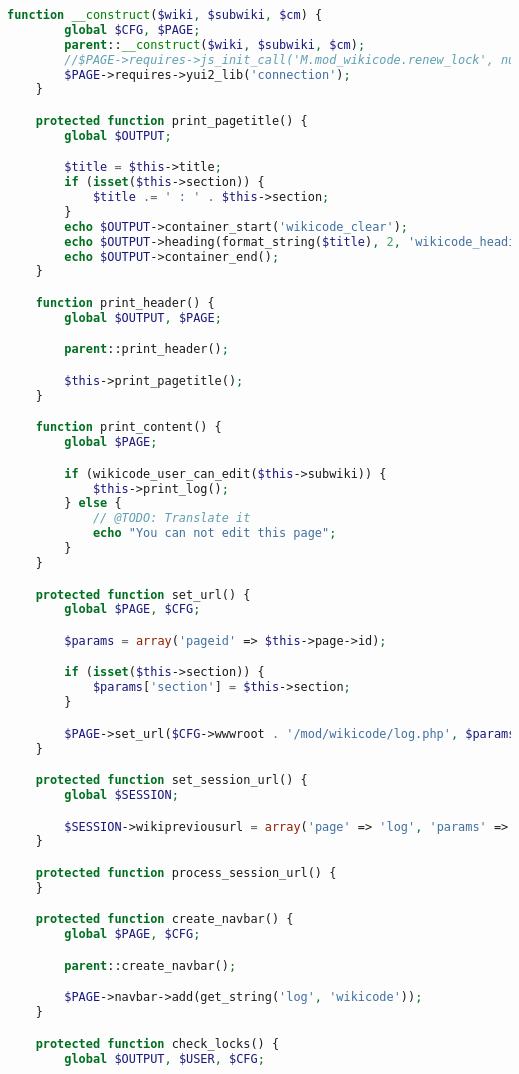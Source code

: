 \begin{lstlisting}[language=PHP]
    function __construct($wiki, $subwiki, $cm) {
        global $CFG, $PAGE;
        parent::__construct($wiki, $subwiki, $cm);
        //$PAGE->requires->js_init_call('M.mod_wikicode.renew_lock', null, true);
        $PAGE->requires->yui2_lib('connection');
    }

    protected function print_pagetitle() {
        global $OUTPUT;

        $title = $this->title;
        if (isset($this->section)) {
            $title .= ' : ' . $this->section;
        }
        echo $OUTPUT->container_start('wikicode_clear');
        echo $OUTPUT->heading(format_string($title), 2, 'wikicode_headingtitle');
        echo $OUTPUT->container_end();
    }

    function print_header() {
        global $OUTPUT, $PAGE;

        parent::print_header();

        $this->print_pagetitle();
    }

    function print_content() {
        global $PAGE;

        if (wikicode_user_can_edit($this->subwiki)) {
            $this->print_log();
        } else {
            // @TODO: Translate it
            echo "You can not edit this page";
        }
    }

    protected function set_url() {
        global $PAGE, $CFG;

        $params = array('pageid' => $this->page->id);

        if (isset($this->section)) {
            $params['section'] = $this->section;
        }

        $PAGE->set_url($CFG->wwwroot . '/mod/wikicode/log.php', $params);
    }

    protected function set_session_url() {
        global $SESSION;

        $SESSION->wikipreviousurl = array('page' => 'log', 'params' => array('pageid' => $this->page->id, 'section' => $this->section));
    }

    protected function process_session_url() {
    }

    protected function create_navbar() {
        global $PAGE, $CFG;

        parent::create_navbar();

        $PAGE->navbar->add(get_string('log', 'wikicode'));
    }

    protected function check_locks() {
        global $OUTPUT, $USER, $CFG;


\end{lstlisting}
